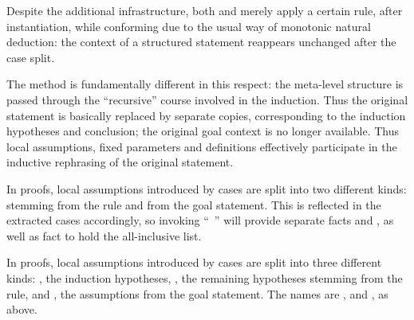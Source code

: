 \begin{isabellebody}
\begin{isamarkuptext}
  \medskip Despite the additional infrastructure, both \hyperlink{method.cases}{\mbox{}}
  and \hyperlink{method.coinduct}{\mbox{}} merely apply a certain rule, after
  instantiation, while conforming due to the usual way of monotonic
  natural deduction: the context of a structured statement 
  reappears unchanged after the case split.

  The \hyperlink{method.induct}{\mbox{}} method is fundamentally different in this
  respect: the meta-level structure is passed through the
  ``recursive'' course involved in the induction.  Thus the original
  statement is basically replaced by separate copies, corresponding to
  the induction hypotheses and conclusion; the original goal context
  is no longer available.  Thus local assumptions, fixed parameters
  and definitions effectively participate in the inductive rephrasing
  of the original statement.

  In \hyperlink{method.induct}{\mbox{}} proofs, local assumptions introduced by cases are split
  into two different kinds:  stemming from the rule and
   from the goal statement.  This is reflected in the
  extracted cases accordingly, so invoking ``\hyperlink{command.case}{\mbox{}}~'' will provide separate facts  and ,
  as well as fact  to hold the all-inclusive list.

  In \hyperlink{method.induction}{\mbox{}} proofs, local assumptions introduced by cases are
  split into three different kinds: , the induction hypotheses,
  , the remaining hypotheses stemming from the rule, and
  , the assumptions from the goal statement. The names are
  ,  and , as above.



\end{isamarkuptext}
\end{isabellebody}
